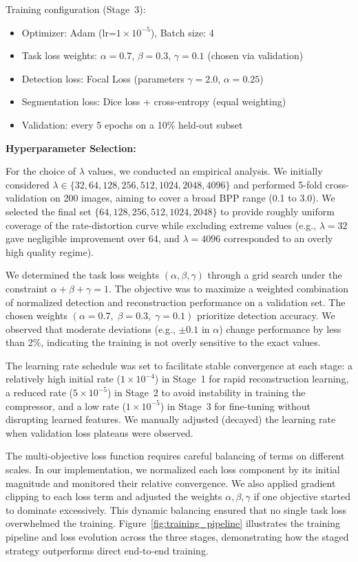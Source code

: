 \documentclass[conference]{IEEEtran}
\begin{document}
Training configuration (Stage~3):
\begin{itemize}
\item Optimizer: Adam (lr=$1\times 10^{-5}$), Batch size: 4
\item Task loss weights: $\alpha=0.7$, $\beta=0.3$, $\gamma=0.1$ (chosen via validation)
\item Detection loss: Focal Loss (parameters $\gamma=2.0$, $\alpha=0.25$)
\item Segmentation loss: Dice loss + cross-entropy (equal weighting)
\item Validation: every 5 epochs on a 10\% held-out subset
\end{itemize}

\textbf{Hyperparameter Selection:}

For the choice of $\lambda$ values, we conducted an empirical analysis. We initially considered $\lambda \in \{32, 64, 128, 256, 512, 1024, 2048, 4096\}$ and performed 5-fold cross-validation on 200 images, aiming to cover a broad BPP range (0.1 to 3.0). We selected the final set $\{64, 128, 256, 512, 1024, 2048\}$ to provide roughly uniform coverage of the rate-distortion curve while excluding extreme values (e.g., $\lambda=32$ gave negligible improvement over 64, and $\lambda=4096$ corresponded to an overly high quality regime).

We determined the task loss weights $(\alpha,\beta,\gamma)$ through a grid search under the constraint $\alpha+\beta+\gamma=1$. The objective was to maximize a weighted combination of normalized detection and reconstruction performance on a validation set. The chosen weights $(\alpha=0.7,\;\beta=0.3,\;\gamma=0.1)$ prioritize detection accuracy. We observed that moderate deviations (e.g., $\pm0.1$ in $\alpha$) change performance by less than 2\%, indicating the training is not overly sensitive to the exact values.

The learning rate schedule was set to facilitate stable convergence at each stage: a relatively high initial rate ($1\times 10^{-4}$) in Stage~1 for rapid reconstruction learning, a reduced rate ($5\times 10^{-5}$) in Stage~2 to avoid instability in training the compressor, and a low rate ($1\times 10^{-5}$) in Stage~3 for fine-tuning without disrupting learned features. We manually adjusted (decayed) the learning rate when validation loss plateaus were observed.

The multi-objective loss function requires careful balancing of terms on different scales. In our implementation, we normalized each loss component by its initial magnitude and monitored their relative convergence. We also applied gradient clipping to each loss term and adjusted the weights $\alpha,\beta,\gamma$ if one objective started to dominate excessively. This dynamic balancing ensured that no single task loss overwhelmed the training. Figure~\ref{fig:training_pipeline} illustrates the training pipeline and loss evolution across the three stages, demonstrating how the staged strategy outperforms direct end-to-end training.
\end{document}

